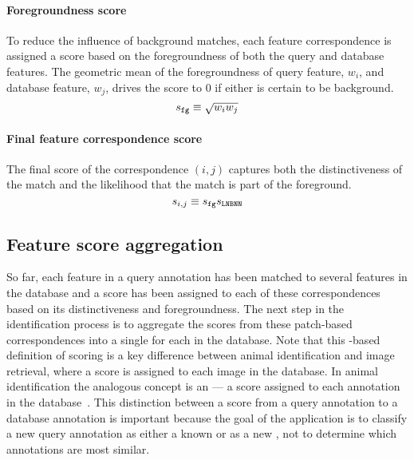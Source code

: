         \paragraph{Foregroundness score}
            To reduce the influence of background matches, each feature correspondence is assigned a score based on
            the foregroundness of both the query and database features. The geometric mean of the foregroundness of
            query feature, $w_i$, and database feature, $w_j$, drives the score to $0$ if either is certain to be
            background. %
            \begin{equation}
                s_{{\tt fg}} \equiv \sqrt{w_i w_j}
            \end{equation}

        \paragraph{Final feature correspondence score}
            The final score of the correspondence $(i, j)$ captures both the distinctiveness of the match and the
            likelihood that the match is part of the foreground.
              \begin{equation}\label{eqn:featscore}
                  s_{i,j} \equiv s_{{\tt fg}} s_{\tt{LNBNN}} 
              \end{equation}

    \subsection{Feature score aggregation}\label{subsec:namescore}

        So far, each feature in a query annotation has been matched to several features in the database and a score
        has been assigned to each of these correspondences based on its distinctiveness and foregroundness. The
        next step in the identification process is to aggregate the scores from these patch-based correspondences
        into a single \glossterm{\namescore} for each \name{} in the database. Note that this \name-based
        definition of scoring is a key difference between animal identification and image retrieval, where a score
        is assigned to each image in the database. In animal identification the analogous concept is an
        \glossterm{\annotscore} --- a score assigned to each annotation in the database~\cite{philbin_object_2007}.
        This distinction between a score from a query annotation to a database annotation is important because the
        goal of the application is to classify a new query annotation as either a known \name{} or as a new
        \name{}, not to determine which annotations are most similar.

